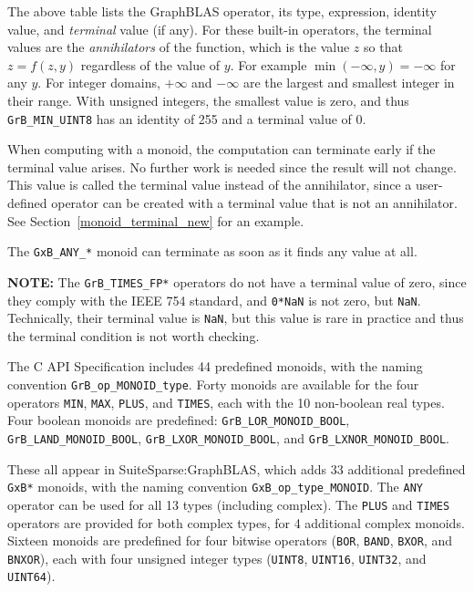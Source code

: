 \documentclass[12pt]{article}
\begin{document}
The above table lists the GraphBLAS operator, its type, expression, identity
value, and {\em terminal} value (if any).  For these built-in operators, the
terminal values are the {\em annihilators} of the function, which is the value
$z$ so that $z=f(z,y)$ regardless of the value of $y$.  For example
$\min(-\infty,y) = -\infty$ for any $y$.  For integer domains, $+\infty$ and
$-\infty$ are the largest and smallest integer in their range.  With unsigned
integers, the smallest value is zero, and thus \verb'GrB_MIN_UINT8' has an
identity of 255 and a terminal value of 0.

When computing with a monoid, the computation can terminate early if the
terminal value arises.  No further work is needed since the result will not
change.  This value is called the terminal value instead of the annihilator,
since a user-defined operator can be created with a terminal value that is not
an annihilator.  See Section~\ref{monoid_terminal_new} for an example.

The \verb'GxB_ANY_*' monoid can terminate as soon as it finds any value at all.

{\bf NOTE:}
The \verb'GrB_TIMES_FP*' operators do not have a terminal value of zero, since
they comply with the IEEE 754 standard, and \verb'0*NaN' is not zero, but
\verb'NaN'.  Technically, their terminal value is \verb'NaN', but this value is
rare in practice and thus the terminal condition is not worth checking.

The C API Specification includes 44 predefined monoids, with the naming
convention \verb'GrB_op_MONOID_type'.  Forty monoids are available for the four
operators \verb'MIN', \verb'MAX', \verb'PLUS', and \verb'TIMES', each with the
10 non-boolean real types.  Four boolean monoids are predefined:
\verb'GrB_LOR_MONOID_BOOL', \verb'GrB_LAND_MONOID_BOOL',
\verb'GrB_LXOR_MONOID_BOOL', and \verb'GrB_LXNOR_MONOID_BOOL'.

These all appear in SuiteSparse:GraphBLAS, which adds 33 additional predefined
\verb'GxB*' monoids, with the naming convention \verb'GxB_op_type_MONOID'.  The
\verb'ANY' operator can be used for all 13 types (including complex).  The
\verb'PLUS' and \verb'TIMES' operators are provided for both complex types, for
4 additional complex monoids.  Sixteen monoids are predefined for four bitwise
operators (\verb'BOR', \verb'BAND', \verb'BXOR', and \verb'BNXOR'), each with
four unsigned integer types (\verb'UINT8', \verb'UINT16', \verb'UINT32', and
\verb'UINT64').
\end{document}
